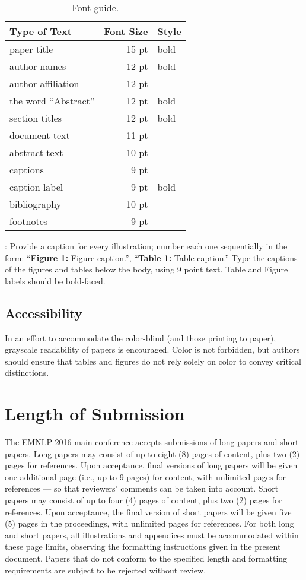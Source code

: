 \documentclass[11pt,letterpaper]{article}
\begin{document}
\begin{table}
\small
\centering
\begin{tabular}{|l|rl|}
\hline \bf Type of Text & \bf Font Size & \bf Style \\ \hline
paper title & 15 pt & bold \\
author names & 12 pt & bold \\
author affiliation & 12 pt & \\
the word ``Abstract'' & 12 pt & bold \\
section titles & 12 pt & bold \\
document text & 11 pt  &\\
abstract text & 10 pt & \\
captions & 9 pt & \\
caption label & 9 pt & bold \\
bibliography & 10 pt & \\
footnotes & 9 pt & \\
\hline
\end{tabular}
\caption{\label{font-table} Font guide.}
\end{table}

: Provide a caption for every illustration; number each one
sequentially in the form:  ``{\bf Figure 1:} Figure caption.'',
``{\bf Table 1:} Table caption.''  Type the captions of the figures and tables
below the body, using 9 point text. Table and Figure labels should be
bold-faced.

\subsection{Accessibility}
\label{ssec-emnlp2016:accessibility}

In an effort to accommodate the color-blind (and those printing to paper),
grayscale readability of papers is encouraged. Color is not forbidden, but 
authors should ensure that tables and figures do not rely solely on color to
convey critical distinctions.

\section{Length of Submission}
\label{sec-emnlp2016:length}

The EMNLP 2016 main conference accepts submissions of long papers and
short papers.  Long papers may consist of up to eight (8) pages of content, plus
two (2) pages for references. Upon acceptance, final versions of long papers
will be given one additional page (i.e., up to 9 pages) for content, with
unlimited pages for references --- so that reviewers' comments can be taken
into account.  Short papers may consist of up to four (4) pages of content,
plus two (2) pages for references. Upon acceptance, the final version of
short papers will be given five (5) pages in the proceedings, with unlimited
pages for references.  For both long and short papers, all illustrations and
appendices must be accommodated within these page limits, observing the
formatting instructions given in the present document.  Papers that do not
conform to the specified length and formatting requirements are subject to
be rejected without review.
\end{document}
